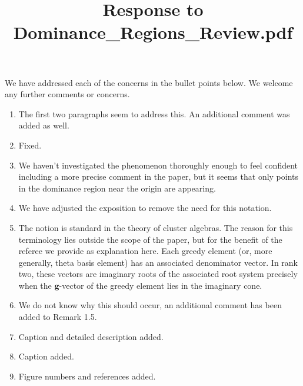 \documentclass{amsart}
\title{Response to Dominance\_Regions\_Review.pdf}
\begin{document}
  
  \maketitle

  We have addressed each of the concerns in the bullet points below.  We welcome any further comments or concerns.
  \begin{enumerate}
    \item The first two paragraphs seem to address this.
      An additional comment was added as well.
    \item Fixed.
    \item We haven't investigated the phenomenon thoroughly enough to feel confident including a more precise comment in the paper, but it seems that only points in the dominance region near the origin are appearing.
    \item We have adjusted the exposition to remove the need for this notation.
    \item The notion is standard in the theory of cluster algebras.
      The reason for this terminology lies outside the scope of the paper, but for the benefit of the referee we provide as explanation here.
      Each greedy element (or, more generally, theta basis element) has an associated denominator vector.
      In rank two, these vectors are imaginary roots of the associated root system precisely when the $\mathbf{g}$-vector of the greedy element lies in the imaginary cone.
    \item We do not know why this should occur, an additional comment has been added to Remark 1.5.
    \item Caption and detailed description added.
    \item Caption added.
    \item Figure numbers and references added.
  \end{enumerate}
\end{document}
